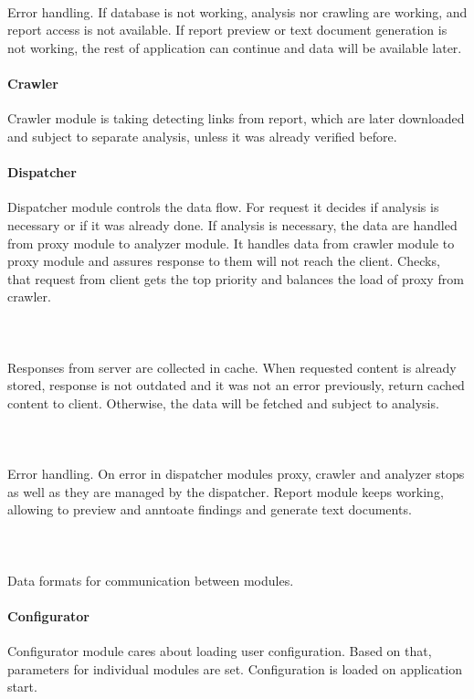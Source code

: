 \documentclass[10pt]{article}
\begin{document}
\paragraph{~}Error handling. If database is not working, analysis nor crawling are working, and report access is not available. If report preview or text document generation is not working, the rest of application can continue and data will be available later.
\paragraph{Crawler} Crawler module is taking detecting links from report, which are later downloaded and subject to separate analysis, unless it was already verified before.
\paragraph{Dispatcher} Dispatcher module controls the data flow. For request it decides if analysis is necessary or if it was already done. If analysis is necessary, the data are handled from proxy module to analyzer module. It handles data from crawler module to proxy module and assures response to them will not reach the client. Checks, that request from client gets the top priority and balances the load of proxy from crawler.
\paragraph{~} Responses from server are collected in cache. When requested content is already stored, response is not outdated and it was not an error previously, return cached content to client. Otherwise, the data will be fetched and subject to analysis.
\paragraph{~} Error handling. On error in dispatcher modules proxy, crawler and analyzer stops as well as they are managed by the dispatcher. Report module keeps working, allowing to preview and anntoate findings and generate text documents.
\paragraph{~} Data formats for communication between modules.
\paragraph{Configurator} Configurator module cares about loading user configuration. Based on that, parameters for individual modules are set. Configuration is loaded on application start.
\end{document}
